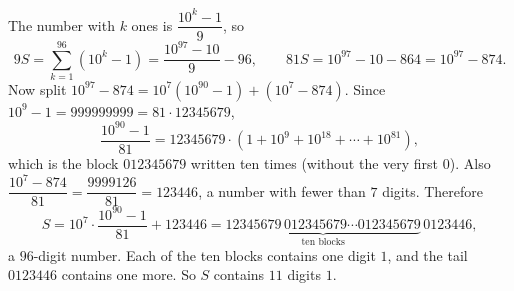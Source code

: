 The number with $k$ ones is $\dfrac{10^k-1}{9}$, so
\[
9S=\sum_{k=1}^{96}(10^k-1)=\dfrac{10^{97}-10}{9}-96,\qquad 81S=10^{97}-10-864=10^{97}-874 .
\]
Now split $10^{97}-874=10^7\left(10^{90}-1\right)+\left(10^7-874\right)$. Since $10^9-1=999999999=81\cdot12345679$,
\[
\dfrac{10^{90}-1}{81}=12345679\cdot\left(1+10^9+10^{18}+\cdots+10^{81}\right),
\]
which is the block $012345679$ written ten times (without the very first $0$). Also $\dfrac{10^7-874}{81}=\dfrac{9999126}{81}=123446$, a number with fewer than $7$ digits. Therefore
\[
S=10^7\cdot\dfrac{10^{90}-1}{81}+123446=\underbrace{12345679\,012345679\cdots012345679}_{\text{ten blocks}}\,0123446 ,
\]
a $96$-digit number. Each of the ten blocks contains one digit $1$, and the tail $0123446$ contains one more. So $S$ contains $\boxed{11}$ digits $1$.
